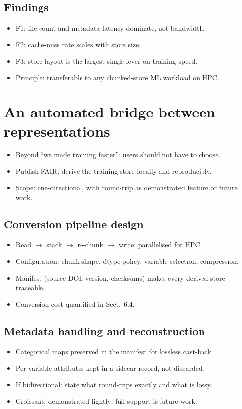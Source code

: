 \documentclass[gmd, manuscript]{copernicus}
\begin{document}
\subsection{Findings}
\begin{itemize}
\item F1: file count and metadata latency dominate, not bandwidth.
\item F2: cache-miss rate scales with store size.
\item F3: store layout is the largest single lever on training speed.
\item Principle: transferable to any chunked-store ML workload on HPC.
\end{itemize}
\section{An automated bridge between representations}
\begin{itemize}
\item Beyond ``we made training faster'': users should not have to choose.
\item Publish FAIR; derive the training store locally and reproducibly.
\item Scope: one-directional, with round-trip as demonstrated feature or future work.
\end{itemize}
\subsection{Conversion pipeline design}
\begin{itemize}
\item Read $\rightarrow$ stack $\rightarrow$ re-chunk $\rightarrow$ write; parallelised for HPC.
\item Configuration: chunk shape, dtype policy, variable selection, compression.
\item Manifest (source DOI, version, checksums) makes every derived store traceable.
\item Conversion cost quantified in Sect.~6.4.
\end{itemize}
\subsection{Metadata handling and reconstruction}
\begin{itemize}
\item Categorical maps preserved in the manifest for lossless cast-back.
\item Per-variable attributes kept in a sidecar record, not discarded.
\item If bidirectional: state what round-trips exactly and what is lossy.
\item Croissant: demonstrated lightly; full support is future work.
\end{itemize}
\end{document}
